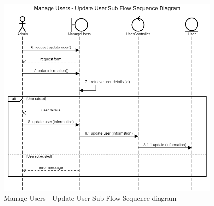 \begin{figure}[H]
    \centering
    \includegraphics[width=1.0\textwidth]{images/Manage Users - Update User Sub Flow Sequence Diagram.png}
    \caption{Manage Users - Update User Sub Flow Sequence diagram}
    \label{fig:SeqUsersUpdate}
\end{figure}

